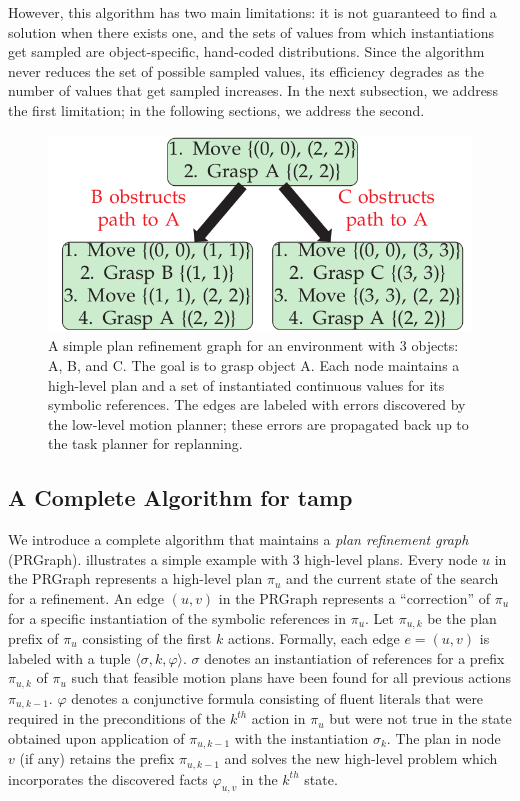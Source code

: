 However, this algorithm has two
main limitations: it is not guaranteed to find a solution when
there exists one, and the sets of values from which instantiations
get sampled are object-specific, hand-coded distributions. Since the algorithm
never reduces the set of possible sampled values, its
efficiency degrades as the number of values that get sampled increases. In the next subsection,
we address the first limitation; in the following sections, we address the second.

\begin{figure}[t]
  \centering
    \includegraphics[scale=0.3]{images/ex_prg.png}
  \caption{\small{A simple plan refinement graph for an environment with 3 objects: A,
B, and C. The goal is to grasp object A. Each node maintains a high-level
plan and a set of instantiated continuous values for its symbolic references.
The edges are labeled with errors discovered by the low-level motion planner; these errors are
propagated back up to the task planner for replanning.}}
  \label{fig:prg}
\end{figure}

\subsection{A Complete Algorithm for {\sc tamp}}
We introduce a complete algorithm that maintains a \emph{plan
  refinement graph} ({\sc PRGraph}).  illustrates a simple example with 3 high-level plans.
Every node $u$ in the {\sc PRGraph}
represents a high-level plan $\pi_u$ and the current state of the search
for a refinement. An edge $(u,v)$ in the {\sc PRGraph}
represents a ``correction'' of $\pi_u$ for a specific instantiation of
the symbolic references in $\pi_u$. Let $\pi_{u,k}$ be the plan prefix of
$\pi_u$ consisting of the first $k$ actions. Formally, each edge
$e=(u,v)$ is labeled with a tuple $\langle \sigma, k, \varphi \rangle$.
$\sigma$ denotes an instantiation of references for a prefix $\pi_{u,k}$ of
$\pi_u$ such that feasible motion plans have been found for all
previous actions $\pi_{u,k-1}$. $\varphi$ denotes a conjunctive formula
consisting of fluent literals
that were required in the preconditions of the $k^{th}$ action in
$\pi_u$ but were not true in the state obtained upon
application of $\pi_{u,k-1}$ with the instantiation $\sigma_k$.  The
plan in node $v$ (if any) retains the prefix $\pi_{u,k-1}$ and solves
the new high-level problem which incorporates the discovered facts $\varphi_{u,v}$
in the $k^{th}$ state.

